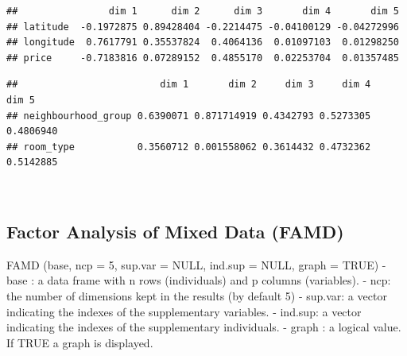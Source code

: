 \documentclass[
]{article}
\newenvironment{Shaded}{\begin{snugshade}}{\end{snugshade}}
\newcommand{\DataTypeTok}[1]{\textcolor[rgb]{0.13,0.29,0.53}{#1}}
\newcommand{\DecValTok}[1]{\textcolor[rgb]{0.00,0.00,0.81}{#1}}
\newcommand{\KeywordTok}[1]{\textcolor[rgb]{0.13,0.29,0.53}{\textbf{#1}}}
\newcommand{\NormalTok}[1]{#1}
\newcommand{\OperatorTok}[1]{\textcolor[rgb]{0.81,0.36,0.00}{\textbf{#1}}}
\newcommand{\StringTok}[1]{\textcolor[rgb]{0.31,0.60,0.02}{#1}}
\begin{document}
\begin{Shaded}
\end{Shaded}

\begin{verbatim}
##                dim 1      dim 2      dim 3       dim 4       dim 5
## latitude  -0.1972875 0.89428404 -0.2214475 -0.04100129 -0.04272996
## longitude  0.7617791 0.35537824  0.4064136  0.01097103  0.01298250
## price     -0.7183816 0.07289152  0.4855170  0.02253704  0.01357485
\end{verbatim}

\begin{Shaded}
\end{Shaded}

\begin{verbatim}
##                         dim 1       dim 2     dim 3     dim 4     dim 5
## neighbourhood_group 0.6390071 0.871714919 0.4342793 0.5273305 0.4806940
## room_type           0.3560712 0.001558062 0.3614432 0.4732362 0.5142885
\end{verbatim}

~\\

\hypertarget{factor-analysis-of-mixed-data-famd}{%
\subsection{Factor Analysis of Mixed Data
(FAMD)}\label{factor-analysis-of-mixed-data-famd}}

FAMD (base, ncp = 5, sup.var = NULL, ind.sup = NULL, graph = TRUE) -
base : a data frame with n rows (individuals) and p columns (variables).
- ncp: the number of dimensions kept in the results (by default 5) -
sup.var: a vector indicating the indexes of the supplementary variables.
- ind.sup: a vector indicating the indexes of the supplementary
individuals. - graph : a logical value. If TRUE a graph is displayed.

\begin{Shaded}
\end{Shaded}
\end{document}
